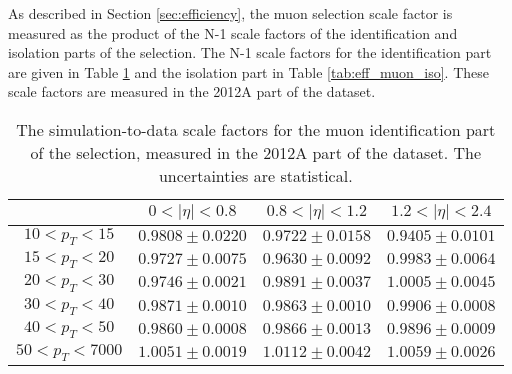 
As described in Section \ref{sec:efficiency}, the muon selection
scale factor is measured as the product of the N-1 scale factors 
of the identification and isolation parts of the selection.
The N-1 scale factors for the identification part are given in Table \ref{tab:eff_muon_id}
and the isolation part in Table \ref{tab:eff_muon_iso}.
These scale factors are measured in the 2012A part of the dataset.

\begin{table}[!ht]
\begin{center}
\begin{tabular}{c|c|c|c}
\hline & $0 < |\eta| < 0.8$ & $0.8 < |\eta| < 1.2$ & $1.2 < |\eta| < 2.4$  \\
\hline
$ 10 < p_T <  15$ & $0.9808 \pm 0.0220$ & $0.9722 \pm 0.0158$ & $0.9405 \pm 0.0101$  \\
$ 15 < p_T <  20$ & $0.9727 \pm 0.0075$ & $0.9630 \pm 0.0092$ & $0.9983 \pm 0.0064$  \\
$ 20 < p_T <  30$ & $0.9746 \pm 0.0021$ & $0.9891 \pm 0.0037$ & $1.0005 \pm 0.0045$  \\
$ 30 < p_T <  40$ & $0.9871 \pm 0.0010$ & $0.9863 \pm 0.0010$ & $0.9906 \pm 0.0008$  \\
$ 40 < p_T <  50$ & $0.9860 \pm 0.0008$ & $0.9866 \pm 0.0013$ & $0.9896 \pm 0.0009$  \\
$ 50 < p_T < 7000$ & $1.0051 \pm 0.0019$ & $1.0112 \pm 0.0042$ & $1.0059 \pm 0.0026$  \\
\hline
\end{tabular}
\caption{The simulation-to-data scale factors for the muon
identification part of the selection, measured in the 2012A part 
of the dataset. The uncertainties are statistical.}
\label{tab:eff_muon_id}
\end{center}
\end{table}

